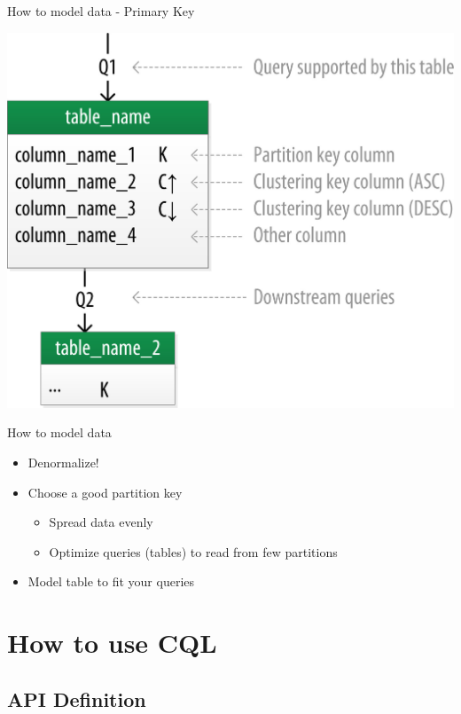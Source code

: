 \documentclass[
  10pt
]{beamer}
\begin{document}
\begin{frame}{How to model data - Primary Key \cite{cassandra_oreilly}}
  \begin{center}
    \includegraphics[width=0.75\columnwidth]{resources/model_example_primary_key.jpeg}
  \end{center}
\end{frame}

\begin{frame}{How to model data}
  \begin{itemize}
    \item Denormalize!
    \item Choose a good partition key
      \begin{itemize}
        \item Spread data evenly
        \item Optimize queries (tables) to read from few partitions
      \end{itemize}
    \item Model table to fit your queries
  \end{itemize}
\end{frame}

\section{How to use CQL}  %

\subsection{API Definition}
\end{document}
